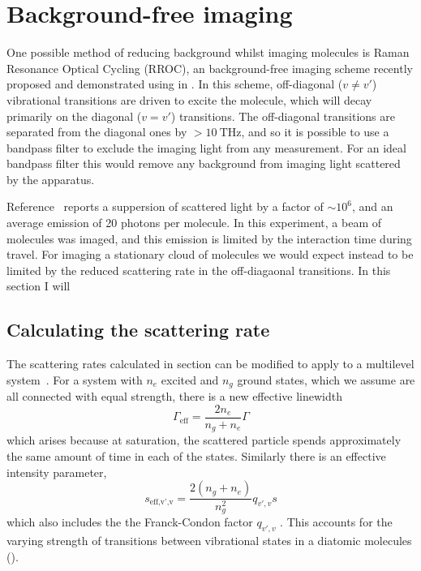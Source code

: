 \section{Background-free imaging}


One possible method of reducing background whilst imaging molecules is Raman
Resonance Optical Cycling (RROC), an background-free imaging scheme recently
proposed and demonstrated using \SrF{} in . In this scheme,
off-diagonal ($v\neq v'$) vibrational transitions are driven to excite the
molecule, which will decay primarily on the diagonal ($v=v'$) transitions. The
off-diagonal transitions are separated from the diagonal ones by
$>\SI{10}{\tera\hertz}$, and so it is possible to use a bandpass filter to
exclude the imaging light from any measurement. For an ideal bandpass filter
this would remove any background from imaging light scattered by the apparatus.

Reference~\cite{Shaw2021} reports a suppersion of scattered light by a factor
of $\sim10^6$, and an average emission of 20 photons per molecule. In this
experiment, a beam of molecules was imaged, and this emission is limited by the
interaction time during travel. For imaging a stationary cloud of molecules we
would expect instead to be limited by the reduced scattering rate in the
off-diagaonal transitions. In this section I will 

\subsection{Calculating the scattering rate}

The scattering rates calculated in section  can be modified to
apply to a multilevel system~\cite{Metcalf1999}. For a system with $n_e$
excited and $n_g$ ground states, which we assume are all connected with equal
strength, there is a new effective linewidth
%
\begin{equation}
  \Gamma_\text{eff} = \frac{2n_e}{n_g + n_e}\Gamma
\end{equation}
%
which arises because at saturation, the scattered particle spends approximately
the same amount of time in each of the states. Similarly there is an effective
intensity parameter,
%
\begin{equation}
  s_\text{eff,v',v} = \frac{2(n_g + n_e)}{n_g^2}q_{v',v}s
\end{equation}
%
which also includes the the Franck-Condon factor $q_{v', v}$ . This accounts
for the varying strength of transitions between vibrational states in a
diatomic molecules ().

